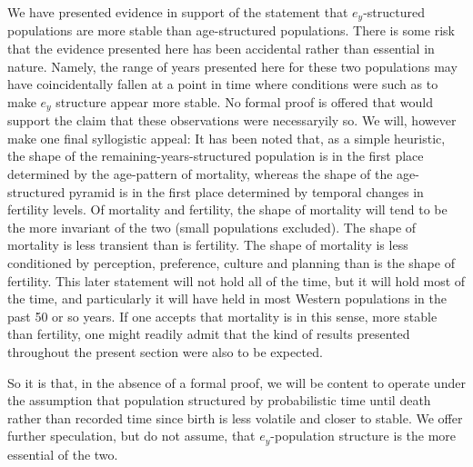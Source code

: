 We have presented evidence in support of the statement that $e_y$-structured
populations are more stable than age-structured populations. There is some
risk that the evidence presented here has been accidental rather
than essential in nature. Namely, the range of years presented here for these
two populations may have coincidentally fallen at a point in time where
conditions were such as to make $e_y$ structure appear more stable. No formal
proof is offered that would support the claim that these observations were
necessaryily so. We will, however make one final syllogistic appeal: It has been
noted that, as a simple heuristic, the shape of the remaining-years-structured
population is in the first place determined by the age-pattern of mortality,
whereas the shape of the age-structured pyramid is in the first place
determined by temporal changes in fertility levels. Of mortality and
fertility, the shape of mortality will tend to be the more invariant of the two
(small populations excluded). The shape of mortality is less transient than is
fertility. The shape of mortality is less conditioned by perception, preference, 
culture and planning than is the shape of fertility. This later statement will
not hold all of the time, but it will hold most of the time, and particularly it
will have held in most Western populations in the past 50 or so years. If one
accepts that mortality is in this sense, more stable than fertility, one might
readily admit that the kind of results presented throughout the present section
were also to be expected. 

So it is that, in the absence of a formal proof, we
will be content to operate under the assumption that population structured by 
probabilistic time until death rather than recorded time since birth is less
volatile and closer to stable. We offer further speculation, but do not assume,
that $e_y$-population structure is the more essential of the two.

 \FloatBarrier
